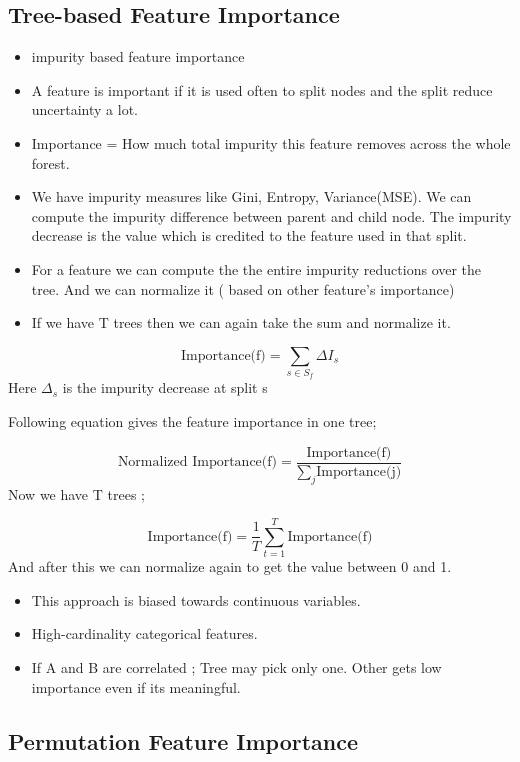 \documentclass[10pt,a4paper]{article}
\begin{document}
	\subsection{Tree-based Feature Importance}
	\begin{itemize}
		\item impurity based feature importance
		\item A feature is important if it is used often to split nodes and the split reduce uncertainty a lot.
		\item Importance = How much total impurity this feature removes across the whole forest.
		\item We have impurity measures like Gini, Entropy, Variance(MSE). We can compute the impurity difference between parent and child node. The impurity decrease is the value which is credited to the feature used in that split.
		\item For a feature we can compute the the entire impurity reductions over the tree. And we can normalize it ( based on other feature’s importance)
		\item If we have T trees then we can again take the sum and normalize it.
	\end{itemize}

	$$	\text{Importance(f)} = \sum_{s \in S_f} \Delta I_s
	$$
	Here $\Delta_s$ is the impurity decrease at split s

	Following equation gives the feature importance in one tree;

	$$	\text{Normalized Importance(f)} = \frac{\text{Importance(f)}}{\sum_j \text{Importance(j)}}
	$$
	Now we have T trees ;

	$$	\text{Importance(f)} = \frac{1}{T} \sum_{t=1}^{T} \text{Importance(f)}
	$$
	And after this we can normalize again to get the value between 0 and 1.

	\begin{itemize}
		\item This approach is biased towards continuous variables.
		\item High-cardinality categorical features.
		\item If A and B are correlated ; Tree may pick only one. Other gets low importance even if its meaningful.
	\end{itemize}

	\subsection{Permutation Feature Importance}
\end{document}
